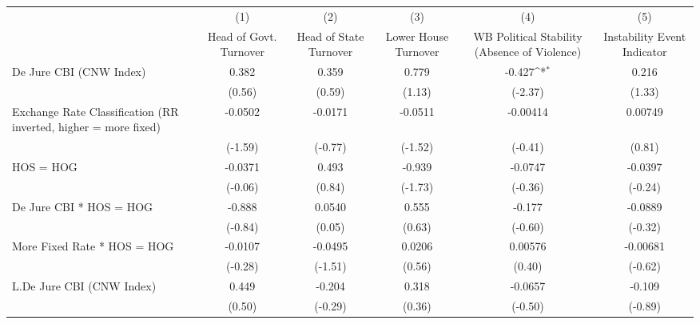 {
\def\sym#1{\ifmmode^{#1}\else\(^{#1}\)\fi}
\begin{longtable}{l*{5}{c}}
\toprule\endfirsthead\midrule\endhead\midrule\endfoot\endlastfoot
                &\multicolumn{1}{c}{(1)}&\multicolumn{1}{c}{(2)}&\multicolumn{1}{c}{(3)}&\multicolumn{1}{c}{(4)}&\multicolumn{1}{c}{(5)}\\
                &\multicolumn{1}{c}{Head of Govt. Turnover}&\multicolumn{1}{c}{Head of State Turnover}&\multicolumn{1}{c}{Lower House Turnover}&\multicolumn{1}{c}{WB Political Stability (Absence of Violence)}&\multicolumn{1}{c}{Instability Event Indicator}\\
\midrule
De Jure CBI (CNW Index)&    0.382         &    0.359         &    0.779         &   -0.427\sym{*}  &    0.216         \\
                &   (0.56)         &   (0.59)         &   (1.13)         &  (-2.37)         &   (1.33)         \\
\addlinespace
Exchange Rate Classification (RR inverted, higher = more fixed)&  -0.0502         &  -0.0171         &  -0.0511         & -0.00414         &  0.00749         \\
                &  (-1.59)         &  (-0.77)         &  (-1.52)         &  (-0.41)         &   (0.81)         \\
\addlinespace
HOS = HOG       &  -0.0371         &    0.493         &   -0.939         &  -0.0747         &  -0.0397         \\
                &  (-0.06)         &   (0.84)         &  (-1.73)         &  (-0.36)         &  (-0.24)         \\
\addlinespace
De Jure CBI * HOS = HOG&   -0.888         &   0.0540         &    0.555         &   -0.177         &  -0.0889         \\
                &  (-0.84)         &   (0.05)         &   (0.63)         &  (-0.60)         &  (-0.32)         \\
\addlinespace
More Fixed Rate * HOS = HOG&  -0.0107         &  -0.0495         &   0.0206         &  0.00576         & -0.00681         \\
                &  (-0.28)         &  (-1.51)         &   (0.56)         &   (0.40)         &  (-0.62)         \\
\addlinespace
L.De Jure CBI (CNW Index)&    0.449         &   -0.204         &    0.318         &  -0.0657         &   -0.109         \\
                &   (0.50)         &  (-0.29)         &   (0.36)         &  (-0.50)         &  (-0.89)         \\

\end{longtable}}
